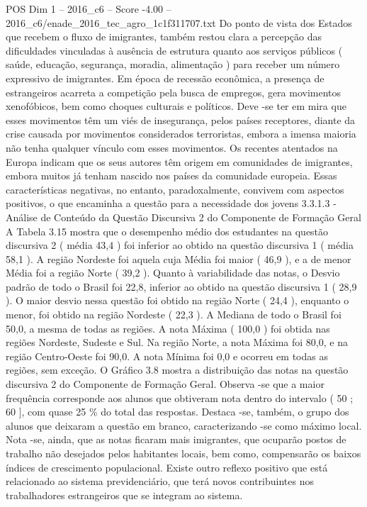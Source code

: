 \begin{textsample}{POS Dim 1 – 2016\_c6 – Score -4.00 – 2016\_c6/enade\_2016\_tec\_agro\_1c1f311707.txt}
Do ponto de vista dos Estados que recebem o fluxo de imigrantes, também restou clara a percepção das dificuldades vinculadas à ausência de estrutura quanto aos serviços públicos ( saúde, educação, segurança, moradia, alimentação ) para receber um número expressivo de imigrantes.
Em época de recessão econômica, a presença de estrangeiros acarreta a competição pela busca de empregos, gera movimentos xenofóbicos, bem como choques culturais e políticos.
Deve -se ter em mira que esses movimentos têm um viés de insegurança, pelos países receptores, diante da crise causada por movimentos considerados terroristas, embora a imensa maioria não tenha qualquer vínculo com esses movimentos.
Os recentes atentados na Europa indicam que os seus autores têm origem em comunidades de imigrantes, embora muitos já tenham nascido nos países da comunidade europeia.
Essas características negativas, no entanto, paradoxalmente, convivem com aspectos positivos, o que encaminha a questão para a necessidade dos jovens 3.3.1.3 - Análise de Conteúdo da Questão Discursiva 2 do Componente de Formação Geral A Tabela 3.15 mostra que o desempenho médio dos estudantes na questão discursiva 2 ( média 43,4 ) foi inferior ao obtido na questão discursiva 1 ( média 58,1 ).
A região Nordeste foi aquela cuja Média foi maior ( 46,9 ), e a de menor Média foi a região Norte ( 39,2 ).
Quanto à variabilidade das notas, o Desvio padrão de todo o Brasil foi 22,8, inferior ao obtido na questão discursiva 1 ( 28,9 ).
O maior desvio nessa questão foi obtido na região Norte ( 24,4 ), enquanto o menor, foi obtido na região Nordeste ( 22,3 ).
A Mediana de todo o Brasil foi 50,0, a mesma de todas as regiões.
A nota Máxima ( 100,0 ) foi obtida nas regiões Nordeste, Sudeste e Sul.
Na região Norte, a nota Máxima foi 80,0, e na região Centro-Oeste foi 90,0.
A nota Mínima foi 0,0 e ocorreu em todas as regiões, sem exceção.
O Gráfico 3.8 mostra a distribuição das notas na questão discursiva 2 do Componente de Formação Geral.
Observa -se que a maior frequência corresponde aos alunos que obtiveram nota dentro do intervalo ( 50 ; 60 ], com quase 25 \% do total das respostas.
Destaca -se, também, o grupo dos alunos que deixaram a questão em branco, caracterizando -se como máximo local.
Nota -se, ainda, que as notas ficaram mais imigrantes, que ocuparão postos de trabalho não desejados pelos habitantes locais, bem como, compensarão os baixos índices de crescimento populacional.
Existe outro reflexo positivo que está relacionado ao sistema previdenciário, que terá novos contribuintes nos trabalhadores estrangeiros que se integram ao sistema.

\end{textsample}

